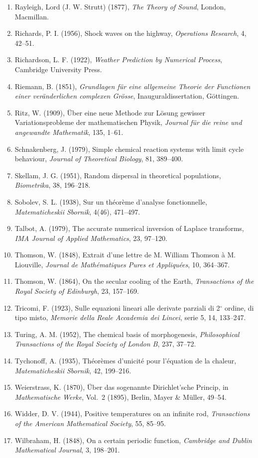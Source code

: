 \documentclass[11pt,a4paper]{article}
\numberwithin{equation}{section}
\theoremstyle{definition}
\begin{document}
\begin{enumerate}
\item Rayleigh, Lord (J. W. Strutt) (1877), \emph{The Theory of Sound}, London, Macmillan.
\item Richards, P. I. (1956), Shock waves on the highway, \emph{Operations Research}, 4, 42--51.
\item Richardson, L. F. (1922), \emph{Weather Prediction by Numerical Process}, Cambridge University Press.
\item Riemann, B. (1851), \emph{Grundlagen f\"ur eine allgemeine Theorie der Functionen einer ver\"anderlichen complexen Gr\"osse}, Inauguraldissertation, G\"ottingen.
\item Ritz, W. (1909), \"Uber eine neue Methode zur L\"osung gewisser Variationsprobleme der mathematischen Physik, \emph{Journal f\"ur die reine und angewandte Mathematik}, 135, 1--61.
\item Schnakenberg, J. (1979), Simple chemical reaction systems with limit cycle behaviour, \emph{Journal of Theoretical Biology}, 81, 389--400.
\item Skellam, J. G. (1951), Random dispersal in theoretical populations, \emph{Biometrika}, 38, 196--218.
\item Sobolev, S. L. (1938), Sur un th\'eor\`eme d'analyse fonctionnelle, \emph{Matematicheskii Sbornik}, 4(46), 471--497.
\item Talbot, A. (1979), The accurate numerical inversion of Laplace transforms, \emph{IMA Journal of Applied Mathematics}, 23, 97--120.
\item Thomson, W. (1848), Extrait d'une lettre de M. William Thomson \`a M. Liouville, \emph{Journal de Math\'ematiques Pures et Appliqu\'ees}, 10, 364--367.
\item Thomson, W. (1864), On the secular cooling of the Earth, \emph{Transactions of the Royal Society of Edinburgh}, 23, 157--169.
\item Tricomi, F. (1923), Sulle equazioni lineari alle derivate parziali di 2$^\circ$ ordine, di tipo misto, \emph{Memorie della Reale Accademia dei Lincei}, serie 5, 14, 133--247.
\item Turing, A. M. (1952), The chemical basis of morphogenesis, \emph{Philosophical Transactions of the Royal Society of London B}, 237, 37--72.
\item Tychonoff, A. (1935), Th\'eor\`emes d'unicit\'e pour l'\'equation de la chaleur, \emph{Matematicheskii Sbornik}, 42, 199--216.
\item Weierstrass, K. (1870), \"Uber das sogenannte Dirichlet'sche Princip, in \emph{Mathematische Werke}, Vol.~2 (1895), Berlin, Mayer \& M\"uller, 49--54.
\item Widder, D. V. (1944), Positive temperatures on an infinite rod, \emph{Transactions of the American Mathematical Society}, 55, 85--95.
\item Wilbraham, H. (1848), On a certain periodic function, \emph{Cambridge and Dublin Mathematical Journal}, 3, 198--201.
\end{enumerate}
\end{document}
